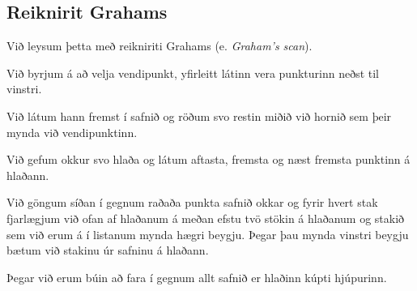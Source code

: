 \subsection{Reiknirit Grahams}
{
    {
        \item<1-> Við leysum þetta með reikniriti Grahams (e. \emph{Graham's scan}).
        \item<2-> Við byrjum á að velja vendipunkt, yfirleitt látinn vera punkturinn neðst til vinstri.
        \item<3-> Við látum hann fremst í safnið og röðum svo restin miðið við hornið sem þeir mynda við vendipunktinn.
        \item<4-> Við gefum okkur svo hlaða og látum aftasta, fremsta og næst fremsta punktinn á hlaðann.
        \item<5-> Við göngum síðan í gegnum raðaða punkta safnið okkar og fyrir hvert stak fjarlægjum við ofan af hlaðanum
                    á meðan efstu tvö stökin á hlaðanum og stakið sem við erum á í listanum mynda hægri beygju. Þegar þau mynda
                    vinstri beygju bætum við stakinu úr safninu á hlaðann.
        \item<6-> Þegar við erum búin að fara í gegnum allt safnið er hlaðinn kúpti hjúpurinn.
    }
}

